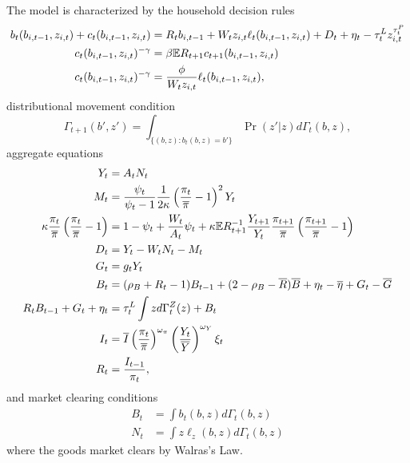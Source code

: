 The model is characterized by the household decision rules
\begin{align*}
    b_{t} (b_{i, t-1}, z_{i, t}) + c_{t} (b_{i, t-1}, z_{i, t}) &= R_t b_{i, t-1} + W_t z_{i, t} \ell_{t} (b_{i, t-1}, z_{i, t}) + D_t + \eta_t - \tau_t^L z_{i, t}^{\tau_t^P} \\
    c_{t} (b_{i, t-1}, z_{i, t})^{-\gamma} &= \beta \mathbb{E} R_{t + 1} c_{t + 1} (b_{i, t-1}, z_{i, t}) \\
    c_{t} (b_{i, t-1}, z_{i, t})^{-\gamma} &= \frac{\phi}{W_t z_{i, t}} \ell_{t} (b_{i, t-1}, z_{i, t}),
\end{align*}
distributional movement condition
\begin{equation*}
    \Gamma_{t + 1} (b', z') = \int_{\{(b, z) : b_t(b, z) = b'\}} \Pr (z' | z) d \Gamma_t (b, z),
\end{equation*}
aggregate equations
\begin{align*}
    Y_t &= A_t N_t \\
    M_t &= \frac{\psi_t}{\psi_t - 1} \frac{1}{2 \kappa} \left( \frac{\pi_t}{\overline{\pi}} - 1 \right)^2 Y_t \\
    \kappa \frac{\pi_t}{\overline{\pi}} \left( \frac{\pi_t}{\overline{\pi}} - 1 \right) &= 1 - \psi_t + \frac{W_t}{A_t} \psi_t + \kappa \mathbb{E} R_{t + 1}^{-1} \frac{Y_{t + 1}}{Y_t} \frac{\pi_{t + 1}}{\overline{\pi}} \left(\frac{\pi_{t + 1}}{\overline{\pi}} - 1 \right) \\
    D_t &= Y_t - W_t N_t - M_t \\
    G_t &= g_t Y_t \\
    B_t &= (\rho_B + R_t - 1) B_{t - 1} + (2 - \rho_B - \overline{R}) \overline{B} + \eta_t - \overline{\eta} + G_t - \overline{G} \\
    R_t B_{t - 1} + G_t + \eta_t &= \tau_t^L \int z d \Gamma_t^Z (z) + B_t \\
    I_t &= \overline{I} \left(\frac{\pi_t}{\overline{\pi}}\right)^{\omega_\pi} \left(\frac{Y_t}{\overline{Y}}\right)^{\omega_Y} \xi_t \\
    R_t &= \frac{I_{t - 1}}{\pi_t},
\end{align*}
and market clearing conditions
\begin{align*}
    B_t &= \int b_t (b, z) d \Gamma_t (b, z) \\
    N_t &= \int z \ell_z (b, z) d \Gamma_t (b, z)
\end{align*}
where the goods market clears by Walras's Law.
